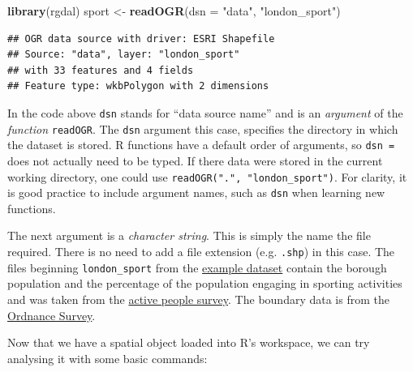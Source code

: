 \documentclass[]{article}
\newenvironment{Shaded}{}{}
\newcommand{\KeywordTok}[1]{\textcolor[rgb]{0.00,0.44,0.13}{\textbf{{#1}}}}
\newcommand{\DataTypeTok}[1]{\textcolor[rgb]{0.56,0.13,0.00}{{#1}}}
\newcommand{\StringTok}[1]{\textcolor[rgb]{0.25,0.44,0.63}{{#1}}}
\newcommand{\NormalTok}[1]{{#1}}
\begin{document}
\begin{Shaded}
\begin{Highlighting}[]
\KeywordTok{library}\NormalTok{(rgdal)}
\NormalTok{sport <- }\KeywordTok{readOGR}\NormalTok{(}\DataTypeTok{dsn =} \StringTok{"data"}\NormalTok{, }\StringTok{"london_sport"}\NormalTok{)}
\end{Highlighting}
\end{Shaded}
\begin{verbatim}
## OGR data source with driver: ESRI Shapefile 
## Source: "data", layer: "london_sport"
## with 33 features and 4 fields
## Feature type: wkbPolygon with 2 dimensions
\end{verbatim}
In the code above \texttt{dsn} stands for ``data source name'' and is an
\emph{argument} of the \emph{function} \texttt{readOGR}. The
\texttt{dsn} argument this case, specifies the directory in which the
dataset is stored. R functions have a default order of arguments, so
\texttt{dsn =} does not actually need to be typed. If there data were
stored in the current working directory, one could use
\texttt{readOGR(".", "london\_sport")}. For clarity, it is good practice
to include argument names, such as \texttt{dsn} when learning new
functions.

The next argument is a \emph{character string}. This is simply the name
the file required. There is no need to add a file extension (e.g.
\texttt{.shp}) in this case. The files beginning \texttt{london\_sport}
from the
\href{http://spatial.ly/wp-content/uploads/2013/12/spatialggplot.zip}{example
dataset} contain the borough population and the percentage of the
population engaging in sporting activities and was taken from the
\href{http://data.london.gov.uk/datastore/package/active-people-survey-kpi-data-borough}{active
people survey}. The boundary data is from the
\href{http://www.ordnancesurvey.co.uk/oswebsite/opendata/}{Ordnance
Survey}.

Now that we have a spatial object loaded into R's workspace, we can try
analysing it with some basic commands:
\end{document}

